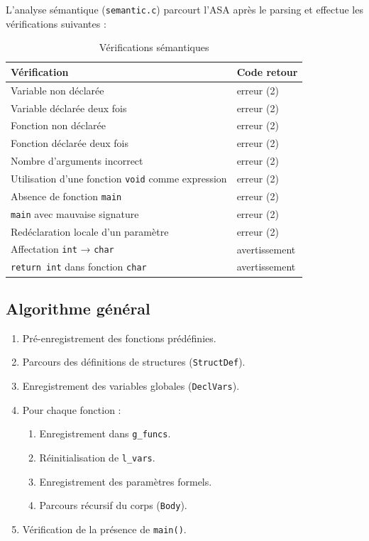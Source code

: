 \documentclass[12pt,a4paper]{article}
\begin{document}
L'analyse sémantique (\texttt{semantic.c}) parcourt l'ASA après le parsing
et effectue les vérifications suivantes :

\begin{table}[H]
\centering
\begin{tabularx}{\linewidth}{lX}
\toprule
\textbf{Vérification} & \textbf{Code retour} \\
\midrule
Variable non déclarée                     & erreur (2) \\
Variable déclarée deux fois               & erreur (2) \\
Fonction non déclarée                     & erreur (2) \\
Fonction déclarée deux fois               & erreur (2) \\
Nombre d'arguments incorrect              & erreur (2) \\
Utilisation d'une fonction \texttt{void} comme expression & erreur (2) \\
Absence de fonction \texttt{main}         & erreur (2) \\
\texttt{main} avec mauvaise signature     & erreur (2) \\
Redéclaration locale d'un paramètre       & erreur (2) \\
Affectation \texttt{int} → \texttt{char}  & avertissement \\
\texttt{return int} dans fonction \texttt{char} & avertissement \\
\bottomrule
\end{tabularx}
\caption{Vérifications sémantiques}
\end{table}

\subsection{Algorithme général}

\begin{enumerate}
  \item Pré-enregistrement des fonctions prédéfinies.
  \item Parcours des définitions de structures (\texttt{StructDef}).
  \item Enregistrement des variables globales (\texttt{DeclVars}).
  \item Pour chaque fonction :
    \begin{enumerate}
      \item Enregistrement dans \texttt{g\_funcs}.
      \item Réinitialisation de \texttt{l\_vars}.
      \item Enregistrement des paramètres formels.
      \item Parcours récursif du corps (\texttt{Body}).
    \end{enumerate}
  \item Vérification de la présence de \texttt{main()}.
\end{enumerate}
\end{document}

